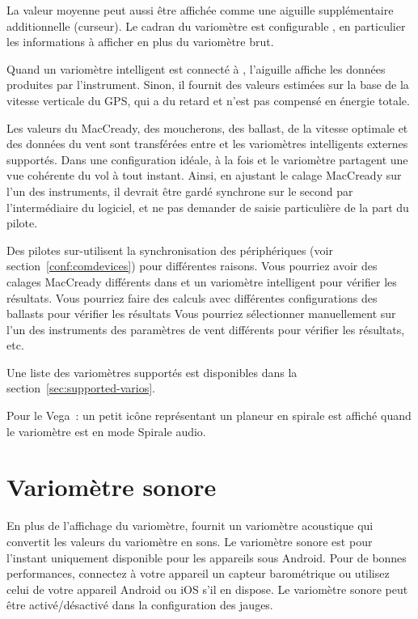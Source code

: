 La valeur moyenne peut aussi être affichée comme une aiguille supplémentaire additionnelle (curseur).
Le cadran du variomètre est configurable , en particulier les informations à afficher en plus du variomètre brut.

Quand un variomètre intelligent est connecté à \xc, l'aiguille affiche les données produites par l'instrument.
Sinon, il fournit des valeurs estimées sur la base de la vitesse verticale du GPS, qui a du retard et n'est pas compensé en énergie totale.

Les valeurs du MacCready, des moucherons, des ballast, de la vitesse optimale et des données du vent sont transférées entre \xc{} et les variomètres intelligents externes supportés.
Dans une configuration idéale, à la fois \xc{} et le variomètre partagent une vue cohérente du vol à tout instant. Ainsi, en ajustant le calage MacCready sur l'un des instruments, il devrait être gardé synchrone sur le second par l'intermédiaire du logiciel, et ne pas demander de saisie particulière de la part du pilote.

Des pilotes sur-utilisent la synchronisation des périphériques (voir section~\ref{conf:comdevices}) pour différentes raisons.
Vous pourriez avoir des calages MacCready différents dans \xc{} et un variomètre intelligent pour vérifier les résultats.
Vous pourriez faire des calculs avec différentes configurations des ballasts pour vérifier les résultats
Vous pourriez sélectionner manuellement sur l'un des instruments des paramètres de vent différents pour vérifier les résultats, etc.

Une liste des variomètres supportés est disponibles dans la section~\ref{sec:supported-varios}.

Pour le Vega~: un petit icône représentant un planeur en spirale est affiché quand le variomètre est en mode Spirale audio.

\section{Variomètre sonore}

En plus de l'affichage du variomètre, \xc{} fournit un variomètre acoustique qui convertit les valeurs du variomètre en sons. Le variomètre sonore est pour l'instant uniquement disponible pour les appareils sous Android.
Pour de bonnes performances, connectez à votre appareil un capteur barométrique ou utilisez celui de votre appareil Android ou iOS s'il en dispose. 
Le variomètre sonore peut être activé/désactivé dans la configuration des jauges.


